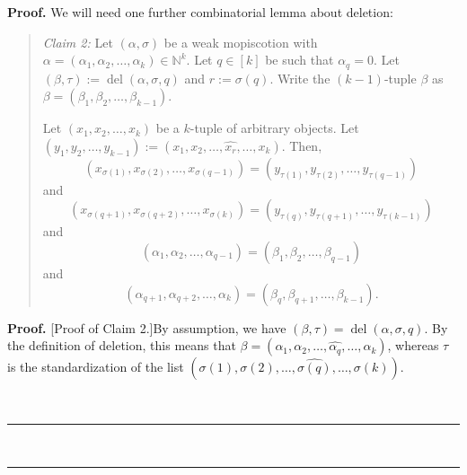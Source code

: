 \documentclass[numbers=enddot,12pt,final,onecolumn,notitlepage]{scrartcl}%
\theoremstyle{definition}
\newenvironment{statement}{\begin{quote}}{\end{quote}}
\newenvironment{fineprint}{\begin{small}}{\end{small}}
\newenvironment{proof}[1][Proof]{\noindent\textbf{#1.} }{\ \rule{0.5em}{0.5em}}
\begin{document}
\begin{fineprint}
\begin{proof}
We will need one further combinatorial lemma about deletion:

\begin{statement}
\textit{Claim 2:} Let $\left(  \alpha,\sigma\right)  $ be a weak mopiscotion
with $\alpha=\left(  \alpha_{1},\alpha_{2},\ldots,\alpha_{k}\right)
\in\mathbb{N}^{k}$. Let $q\in\left[  k\right]  $ be such that $\alpha_{q}=0$.
Let $\left(  \beta,\tau\right)  :=\operatorname*{del}\left(  \alpha
,\sigma,q\right)  $ and $r:=\sigma\left(  q\right)  $. Write the $\left(
k-1\right)  $-tuple $\beta$ as $\beta=\left(  \beta_{1},\beta_{2},\ldots
,\beta_{k-1}\right)  $.

Let $\left(  x_{1},x_{2},\ldots,x_{k}\right)  $ be a $k$-tuple of arbitrary
objects. Let $\left(  y_{1},y_{2},\ldots,y_{k-1}\right)  :=\left(  x_{1}%
,x_{2},\ldots,\widehat{x_{r}},\ldots,x_{k}\right)  $. Then,%
\begin{equation}
\left(  x_{\sigma\left(  1\right)  },x_{\sigma\left(  2\right)  }%
,\ldots,x_{\sigma\left(  q-1\right)  }\right)  =\left(  y_{\tau\left(
1\right)  },y_{\tau\left(  2\right)  },\ldots,y_{\tau\left(  q-1\right)
}\right)  \label{pf.prop.mopis.reduce.c2.x1}%
\end{equation}
and%
\begin{equation}
\left(  x_{\sigma\left(  q+1\right)  },x_{\sigma\left(  q+2\right)  }%
,\ldots,x_{\sigma\left(  k\right)  }\right)  =\left(  y_{\tau\left(  q\right)
},y_{\tau\left(  q+1\right)  },\ldots,y_{\tau\left(  k-1\right)  }\right)
\label{pf.prop.mopis.reduce.c2.x2}%
\end{equation}
and%
\begin{equation}
\left(  \alpha_{1},\alpha_{2},\ldots,\alpha_{q-1}\right)  =\left(  \beta
_{1},\beta_{2},\ldots,\beta_{q-1}\right)  \label{pf.prop.mopis.reduce.c2.a1}%
\end{equation}
and%
\begin{equation}
\left(  \alpha_{q+1},\alpha_{q+2},\ldots,\alpha_{k}\right)  =\left(  \beta
_{q},\beta_{q+1},\ldots,\beta_{k-1}\right)  .
\label{pf.prop.mopis.reduce.c2.a2}%
\end{equation}

\end{statement}

\begin{proof}
[Proof of Claim 2.]By assumption, we have $\left(  \beta,\tau\right)
=\operatorname*{del}\left(  \alpha,\sigma,q\right)  $. By the definition of
deletion, this means that $\beta=\left(  \alpha_{1},\alpha_{2},\ldots
,\widehat{\alpha_{q}},\ldots,\alpha_{k}\right)  $, whereas $\tau$ is the
standardization of the list $\left(  \sigma\left(  1\right)  ,\sigma\left(
2\right)  ,\ldots,\widehat{\sigma\left(  q\right)  },\ldots,\sigma\left(
k\right)  \right)  $.


\end{proof}
\end{proof}
\end{fineprint}
\end{document}

